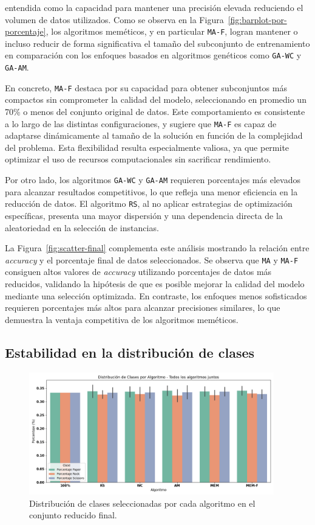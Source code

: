 entendida como la capacidad para mantener una precisión elevada reduciendo el volumen de datos utilizados.
Como se observa en la Figura~\ref{fig:barplot-por-porcentaje}, los algoritmos meméticos, y en particular \texttt{MA-F},
logran mantener o incluso reducir de forma significativa el tamaño del subconjunto de entrenamiento en comparación con
los enfoques basados en algoritmos genéticos como \texttt{GA-WC} y \texttt{GA-AM}.

En concreto, \texttt{MA-F} destaca por su capacidad para obtener subconjuntos más compactos sin comprometer la calidad del modelo,
seleccionando en promedio un 70\% o menos del conjunto original de datos.
Este comportamiento es consistente a lo largo de las distintas configuraciones,
y sugiere que \texttt{MA-F} es capaz de adaptarse dinámicamente al tamaño de la solución en función de la complejidad del problema.
Esta flexibilidad resulta especialmente valiosa, ya que permite optimizar el uso de recursos computacionales sin sacrificar rendimiento.

Por otro lado, los algoritmos \texttt{GA-WC} y \texttt{GA-AM} requieren porcentajes más elevados para alcanzar resultados competitivos,
lo que refleja una menor eficiencia en la reducción de datos.
El algoritmo \texttt{RS}, al no aplicar estrategias de optimización específicas,
presenta una mayor dispersión y una dependencia directa de la aleatoriedad en la selección de instancias.

La Figura~\ref{fig:scatter-final} complementa este análisis mostrando la relación entre \textit{accuracy} y el porcentaje final de datos seleccionados.
Se observa que \texttt{MA} y \texttt{MA-F} consiguen altos valores de \textit{accuracy} utilizando porcentajes de datos más reducidos,
validando la hipótesis de que es posible mejorar la calidad del modelo mediante una selección optimizada.
En contraste, los enfoques menos sofisticados requieren porcentajes más altos para alcanzar precisiones similares,
lo que demuestra la ventaja competitiva de los algoritmos meméticos.

\subsection{Estabilidad en la distribución de clases}\label{sec:distribucion-clases-final}
\begin{figure}[htp]
    \centering
    \includegraphics[width=0.95\textwidth]{imagenes/evaluaciones/final/distribucion-de-clases}
    \caption{Distribución de clases seleccionadas por cada algoritmo en el conjunto reducido final.}
    \label{fig:distribucion-de-clases-final}
\end{figure}

